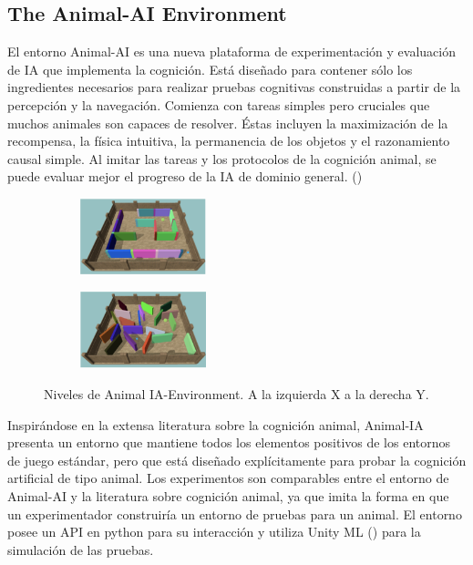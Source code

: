 \subsection{The Animal-AI Environment}

El entorno Animal-AI es una nueva plataforma de experimentación y evaluación de IA que implementa la cognición. Está diseñado para contener sólo los ingredientes necesarios para realizar pruebas cognitivas construidas a partir de la percepción y la navegación. Comienza con tareas simples pero cruciales que muchos animales son capaces de resolver. Éstas incluyen la maximización de la recompensa, la física intuitiva, la permanencia de los objetos y el razonamiento causal simple. Al imitar las tareas y los protocolos de la cognición animal, se puede evaluar mejor el progreso de la IA de dominio general. (\cite{beyret2019animal})

\begin{figure}[ht!]
    \centering
    \begin{subfigure}
      \centering
      \includegraphics[width=0.4\textwidth]{Graphics/animal_1.png}
      \label{fig:animal1}
    \end{subfigure}%
    \begin{subfigure}
      \centering
      \includegraphics[width=0.4\textwidth]{Graphics/animal_3.png}
      \label{fig:animal2}
    \end{subfigure}%
    \caption{Niveles de Animal IA-Environment. A la izquierda X a la derecha Y.}
    \label{fig:animal}
\end{figure}

Inspirándose en la extensa literatura sobre la cognición animal, Animal-IA presenta un entorno que mantiene todos los elementos positivos de los entornos de juego estándar, pero que está diseñado explícitamente para probar la cognición artificial de tipo animal. Los experimentos son comparables entre el entorno de Animal-AI y la literatura sobre cognición animal, ya que imita la forma en que un experimentador construiría un entorno de pruebas para un animal. El entorno posee un API en python para su interacción y utiliza Unity ML (\cite{juliani2018unity}) para la simulación de las pruebas.

